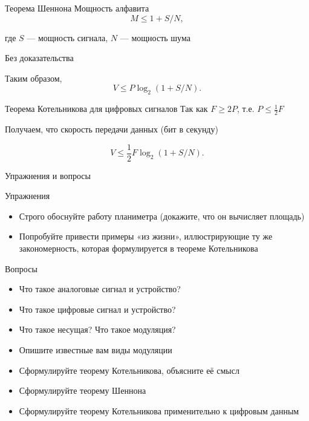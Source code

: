 \documentclass[xetex,aspectratio=43]{beamer}
\begin{document}
\begin{frame}{Теорема Шеннона}
	Мощность алфавита \[M \le 1+S/N,\]

	где \(S\) --- мощность сигнала, \(N\) --- мощность шума

	Без доказательства

	\pause

	Таким образом, \[V \le P \log_2(1+S/N).\]
\end{frame}

\begin{frame}{Теорема Котельникова для цифровых сигналов}
	Так как \(F \ge 2P\), т.е. \(P \le \frac{1}{2} F\)

	Получаем, что скорость передачи данных (бит в секунду)

	\[V \le \frac{1}{2} F \log_2 (1+S/N).\]
\end{frame}

\begin{frame}{Упражнения и вопросы}
	\begin{block}{Упражнения}
		\begin{itemize}

			\item
			Строго обоснуйте работу планиметра (докажите, что он вычисляет
			площадь)
			\item
			Попробуйте привести примеры «из жизни», иллюстрирующие ту же
			закономерность, которая формулируется в теореме Котельникова
		\end{itemize}
	\end{block}

	\begin{block}{Вопросы}
		\begin{itemize}

			\item
			Что такое аналоговые сигнал и устройство?
			\item
			Что такое цифровые сигнал и устройство?
			\item
			Что такое несущая? Что такое модуляция?
			\item
			Опишите известные вам виды модуляции
			\item
			Сформулируйте теорему Котельникова, объясните её смысл
			\item
			Сформулируйте теорему Шеннона
			\item
			Сформулируйте теорему Котельникова применительно к цифровым данным
		\end{itemize}
	\end{block}
\end{frame}

\postamble
\end{document}
